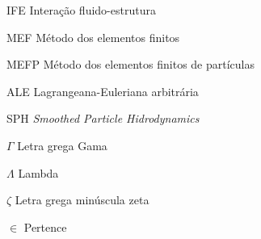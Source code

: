 \documentclass[12pt,
openright,	%
twoside,    %
a4paper,			%
sumario=tradicional,
english,			%
french,				%
brazil				%
]{USPSC}
\begin{document}
	
	
	\setlength{\abovedisplayskip}{0pt}
	\setlength{\belowdisplayskip}{0pt}
	\frenchspacing %
	
	\imprimircapa
	\imprimirfolhaderosto %
	
	
	
	
	
	\listoffigures*
	\cleardoublepage
	\listoftables*
	\cleardoublepage
	\begin{siglas}
		\item[IFE] Interação fluido-estrutura
		\item[MEF] Método dos elementos finitos
		\item[MEFP] Método dos elementos finitos de partículas
		\item[ALE] Lagrangeana-Euleriana arbitrária
		\item[SPH] \textit{Smoothed Particle Hidrodynamics}    
	\end{siglas}
	\begin{simbolos}
		\item[$ \Gamma $] Letra grega Gama
		\item[$ \Lambda $] Lambda
		\item[$ \zeta $] Letra grega minúscula zeta
		\item[$ \in $] Pertence
	\end{simbolos}
\end{document}
